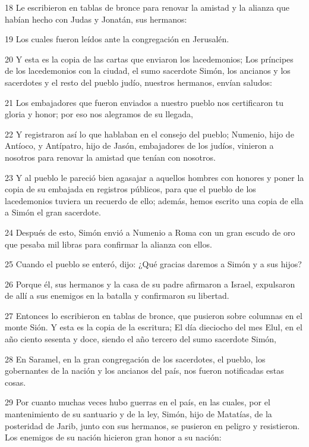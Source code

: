 \par 18 Le escribieron en tablas de bronce para renovar la amistad y la alianza que habían hecho con Judas y Jonatán, sus hermanos:
\par 19 Los cuales fueron leídos ante la congregación en Jerusalén.
\par 20 Y esta es la copia de las cartas que enviaron los lacedemonios; Los príncipes de los lacedemonios con la ciudad, el sumo sacerdote Simón, los ancianos y los sacerdotes y el resto del pueblo judío, nuestros hermanos, envían saludos:
\par 21 Los embajadores que fueron enviados a nuestro pueblo nos certificaron tu gloria y honor; por eso nos alegramos de su llegada,
\par 22 Y registraron así lo que hablaban en el consejo del pueblo; Numenio, hijo de Antíoco, y Antípatro, hijo de Jasón, embajadores de los judíos, vinieron a nosotros para renovar la amistad que tenían con nosotros.
\par 23 Y al pueblo le pareció bien agasajar a aquellos hombres con honores y poner la copia de su embajada en registros públicos, para que el pueblo de los lacedemonios tuviera un recuerdo de ello; además, hemos escrito una copia de ella a Simón el gran sacerdote.
\par 24 Después de esto, Simón envió a Numenio a Roma con un gran escudo de oro que pesaba mil libras para confirmar la alianza con ellos.
\par 25 Cuando el pueblo se enteró, dijo: ¿Qué gracias daremos a Simón y a sus hijos?
\par 26 Porque él, sus hermanos y la casa de su padre afirmaron a Israel, expulsaron de allí a sus enemigos en la batalla y confirmaron su libertad.
\par 27 Entonces lo escribieron en tablas de bronce, que pusieron sobre columnas en el monte Sión. Y esta es la copia de la escritura; El día dieciocho del mes Elul, en el año ciento sesenta y doce, siendo el año tercero del sumo sacerdote Simón,
\par 28 En Saramel, en la gran congregación de los sacerdotes, el pueblo, los gobernantes de la nación y los ancianos del país, nos fueron notificadas estas cosas.
\par 29 Por cuanto muchas veces hubo guerras en el país, en las cuales, por el mantenimiento de su santuario y de la ley, Simón, hijo de Matatías, de la posteridad de Jarib, junto con sus hermanos, se pusieron en peligro y resistieron. Los enemigos de su nación hicieron gran honor a su nación:
